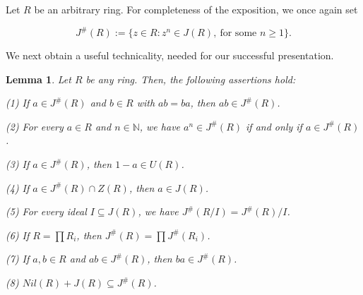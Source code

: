 \documentclass[12pt]{amsart}
\newtheorem{lemma}[theorem]{Lemma}
\theoremstyle{definition}
\begin{document}
Let $R$ be an arbitrary ring. For completeness of the exposition, we once again set

\[
J^{\#}(R):=\{z\in R : z^n\in J(R),\ \text{for some } n\ge 1\}.
\]

We next obtain a useful technicality, needed for our successful presentation.

\begin{lemma}\label{1.2}
Let $R$ be any ring. Then, the following assertions hold:

(1) If $a \in J^{\#}(R)$ and $b \in R$ with $ab = ba$, then $ab \in J^{\#}(R)$.
		
(2) For every $a \in R$ and $n \in \mathbb{N}$, we have $a^n \in J^{\#}(R)$ if and only if $a \in J^{\#}(R)$.
		
(3) If $a \in J^{\#}(R)$, then $1 - a \in U(R)$.
		
(4) If $a \in J^{\#}(R) \cap Z(R)$, then $a \in J(R)$.
		
(5) For every ideal $I \subseteq J(R)$, we have $J^{\#}(R/I) = J^{\#}(R)/I$.
		
(6) If $R = \prod R_i$, then $J^{\#}(R) = \prod J^{\#}(R_i)$.

(7) If $a, b\in R$ and $ab\in J^{\#}(R)$, then $ba\in J^{\#}(R)$.

(8) $Nil(R) + J(R) \subseteq J^{\#}(R)$.
\end{lemma}
\end{document}
